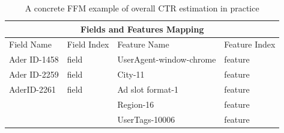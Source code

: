\begin{table}[H]
\caption{A concrete FFM example of overall CTR estimation in practice}
\label{tab:FFMCTR}
\begin{tabular}{ p{3cm}p{3cm}|p{3cm}p{3cm}  }
 \hline
 \multicolumn{4}{c}{Fields and Features Mapping} \\
 \hline
Field Name & Field Index & Feature Name & Feature Index \\
 \hline
Ader ID-1458  & field \color{red}{1}    & UserAgent-window-chrome &  feature \color{blue}{5}\\
Ader ID-2259 & field \color{red}{2}  & City-11  & feature \color{blue}{8}\\
AderID-2261 & field \color{red}{3} & Ad slot format-1 & feature \color{blue}{17}\\
 & & Region-16 & feature \color{blue}{5} \\
  & & UserTags-10006 & feature \color{blue}{6} \\
 \hline
\end{tabular}
\end{table}

